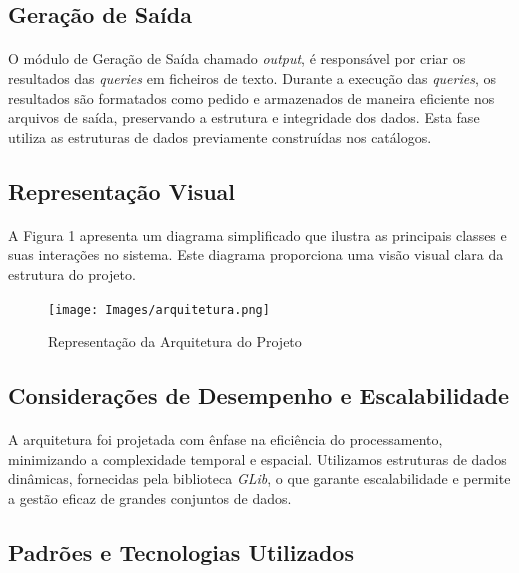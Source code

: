 \documentclass{article}
\begin{document}
\subsection{Geração de Saída}
\paragraph{}O módulo de Geração de Saída chamado \textit{output}, é responsável por criar os resultados das \textit{queries} em ficheiros de texto. Durante a execução das \textit{queries}, os resultados são formatados como pedido e armazenados de maneira eficiente nos arquivos de saída, preservando a estrutura e integridade dos dados. Esta fase utiliza as estruturas de dados previamente construídas nos catálogos.

\subsection{Representação Visual}
\paragraph{}A Figura 1 apresenta um diagrama simplificado que ilustra as principais classes e suas interações no sistema. Este diagrama proporciona uma visão visual clara da estrutura do projeto.
\begin{figure}[H]
\begin{center}
	\texttt{[image: Images/arquitetura.png]} 
        \caption{Representação da Arquitetura do Projeto}
\end{center}
\end{figure}

\subsection{Considerações de Desempenho e Escalabilidade}
\paragraph{}A arquitetura foi projetada com ênfase na eficiência do processamento, minimizando a complexidade temporal e espacial. Utilizamos estruturas de dados dinâmicas, fornecidas pela biblioteca \textit{GLib}, o que garante escalabilidade e permite a gestão eficaz de grandes conjuntos de dados. 

\subsection{Padrões e Tecnologias Utilizados}
\end{document}
